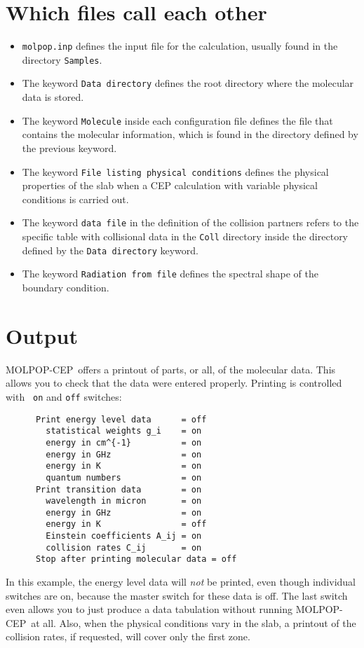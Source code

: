 \documentclass[12pt]{article}
\def\M{MOLPOP-CEP}
\begin{document}
\section{Which files call each other}
\begin{itemize}
\item \texttt{molpop.inp} defines the input file for the calculation, usually found in the directory \texttt{Samples}.
\item The keyword \texttt{Data directory} defines the root directory where the molecular data is stored.
\item The keyword \texttt{Molecule} inside each configuration file defines the file that contains the molecular information, which is found in the directory defined
by the previous keyword.
\item The keyword \texttt{File listing physical conditions} defines the physical properties of the slab when a CEP calculation with variable physical conditions is carried out.
\item The keyword \texttt{data file} in the definition of the collision partners refers to the specific table with collisional data in the \texttt{Coll} directory
inside the directory defined by the \texttt{Data directory} keyword.
\item The keyword \texttt{Radiation from file} defines the spectral shape of the boundary condition.
\end{itemize}




\section{Output}
\label{sec:output}
\M\ offers a printout of parts, or all, of the molecular data. This allows you
to check that the data were entered properly. Printing is controlled with {\tt
on} and {\tt off} switches:
\begin{verbatim}
      Print energy level data      = off
        statistical weights g_i    = on
        energy in cm^{-1}          = on
        energy in GHz              = on
        energy in K                = on
        quantum numbers            = on
      Print transition data        = on
        wavelength in micron       = on
        energy in GHz              = on
        energy in K                = off
        Einstein coefficients A_ij = on
        collision rates C_ij       = on
      Stop after printing molecular data = off
\end{verbatim}
In this example, the energy level data will {\em not} be printed, even though
individual switches are on, because the master switch for these data is off.
The last switch even allows you to just produce a data tabulation without
running \M\ at all. Also, when the physical conditions vary in the slab, a
printout of the collision rates, if requested, will cover only the first zone.
\end{document}
